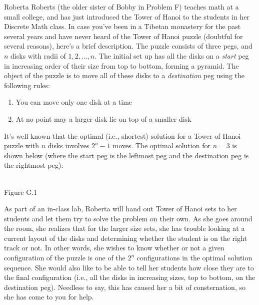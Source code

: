 
Roberta Roberts (the older sister of Bobby in Problem F) teaches math at a small
college, and has just introduced the Tower of Hanoi to the students in her
Discrete Math class. In case you've been in a Tibetan monastery for the past
several years and have never heard of the Tower of Hanoi puzzle (doubtful for
several reasons), here's a brief description. The puzzle consists of three pegs,
and $n$ disks with radii of $1, 2, \ldots, n$.  The initial set up has all the
disks on a {\em start\/} peg in increasing order of their size from top to bottom,
forming a pyramid.  The object of the puzzle is to move all of these disks to
a {\em destination\/} peg using the following rules:
\begin{enumerate}
\item You can move only one disk at a time
\item At no point may a larger disk lie on top of a smaller disk
\end{enumerate}
It's well known that the optimal (i.e., shortest) solution for a Tower of Hanoi
puzzle with $n$ disks involves $2^n-1$ moves.  The optimal
solution for $n=3$ is shown below (where the start peg is the leftmost peg and
the destination peg is the rightmost peg):
\begin{center}
\\
Figure G.1
\end{center}
As part of an in-class lab, Roberta will hand out Tower of Hanoi sets to her students and let them try to solve the problem on their own.  As she goes around the room, she realizes that for the larger size sets, she has trouble looking at a current layout of the disks and determining whether the student is on the right track or not.
In other words, she wishes to know whether or not a given configuration of the puzzle is one of the $2^n$ configurations in the optimal solution sequence. She would also like to
be able to tell her students how close they are to the final configuration (i.e., all
the disks in increasing sizes, top to bottom, on the destination peg).
Needless to say, this has caused her a bit of consternation, so she has come to you for help.

